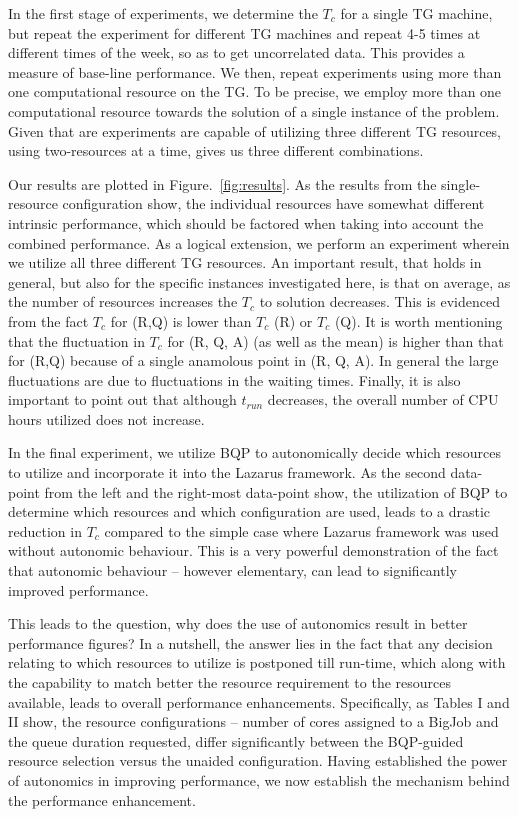 \documentclass[conference,final]{IEEEtran}
\newcommand{\tc}{$T_c$ }
\begin{document}
In the first stage of experiments, we determine the \tc for a single
TG machine, but repeat the experiment for different TG machines and
repeat 4-5 times at different times of the week, so as to get
uncorrelated data.  This provides a measure of base-line performance.
We then, repeat experiments using more than one computational resource
on the TG. To be precise, we employ more than one computational
resource towards the solution of a single instance of the problem.
Given that are experiments are capable of utilizing three different TG
resources, using two-resources at a time, gives us three different
combinations. 

Our results are plotted in Figure.~\ref{fig:results}.  As the results
from the single-resource configuration show, the individual resources
have somewhat different intrinsic performance, which should be
factored when taking into account the combined performance. As a
logical extension, we perform an experiment wherein we utilize all
three different TG resources. An important result, that holds in
general, but also for the specific instances investigated here, is
that on average, as the number of resources increases the \tc to
solution decreases. This is evidenced from the fact \tc for (R,Q) is
lower than \tc (R) or \tc (Q). It is worth mentioning that the
fluctuation in \tc for (R, Q, A) (as well as the mean) is higher than
that for (R,Q) because of a single anamolous point in (R, Q, A).  In
general the large fluctuations are due to fluctuations in the waiting
times. Finally, it is also important to point out that although
$t_{run}$ decreases, the overall number of CPU hours utilized does not
increase. %

In the final experiment, we utilize BQP to autonomically decide which
resources to utilize and incorporate it into the Lazarus framework.
As the second data-point from the left and the right-most data-point
show, the utilization of BQP to determine which resources and which
configuration are used, leads to a drastic reduction in \tc compared
to the simple case where Lazarus framework was used without autonomic
behaviour. This is a very powerful demonstration of the fact that
autonomic behaviour -- however elementary, can lead to significantly
improved performance.

This leads to the question, why does the use of autonomics result in
better performance figures? In a nutshell, the answer lies in the fact
that any decision relating to which resources to utilize is postponed
till run-time, which along with the capability to match better the
resource requirement to the resources available, leads to overall
performance enhancements. Specifically, as Tables I and II show, the
resource configurations -- number of cores assigned to a BigJob and
the queue duration requested, differ significantly between the
BQP-guided resource selection versus the unaided configuration.
Having established the power of autonomics in improving performance,
we now establish the mechanism behind the performance enhancement.
\end{document}
